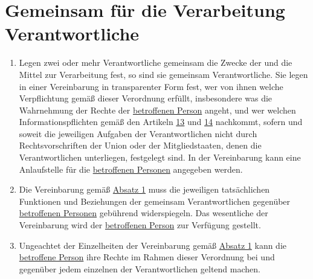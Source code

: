 \chapter{Gemeinsam für die Verarbeitung Verantwortliche}
\label{ch:26}


\begin{enumerate}

  \item Legen zwei oder mehr Verantwortliche gemeinsam die Zwecke der und die Mittel zur Verarbeitung fest, so sind sie
   gemeinsam Verantwortliche. Sie legen in einer Vereinbarung in transparenter Form fest, wer von ihnen welche
   Verpflichtung gemäß dieser Verordnung erfüllt, insbesondere was die Wahrnehmung der Rechte der \hyperref[itm:04-1]{betroffenen Person}
   angeht, und wer welchen Informationspflichten gemäß den Artikeln \hyperref[ch:13]{13} und \hyperref[ch:14]
   {14} nachkommt, sofern und soweit die jeweiligen Aufgaben der Verantwortlichen nicht durch Rechtsvorschriften der
   Union oder der Mitgliedstaaten, denen die Verantwortlichen unterliegen, festgelegt sind. In der Vereinbarung kann
   eine Anlaufstelle für die \hyperref[itm:04-1]{betroffenen Personen} angegeben werden.
  \label{itm:26-1}

  \item Die Vereinbarung gemäß \hyperref[itm:26-1]{Absatz 1} muss die jeweiligen tatsächlichen Funktionen und
   Beziehungen der gemeinsam Verantwortlichen gegenüber \hyperref[itm:04-1]{betroffenen Personen} gebührend widerspiegeln. Das wesentliche
   der Vereinbarung wird der \hyperref[itm:04-1]{betroffenen Person} zur Verfügung gestellt.
  \label{itm:26-2}

  \item Ungeachtet der Einzelheiten der Vereinbarung gemäß \hyperref[itm:26-1]{Absatz 1} kann die \hyperref[itm:04-1]{betroffene Person} ihre
   Rechte im Rahmen dieser Verordnung bei und gegenüber jedem einzelnen der Verantwortlichen geltend machen.
  \label{itm:26-3}

\end{enumerate}


